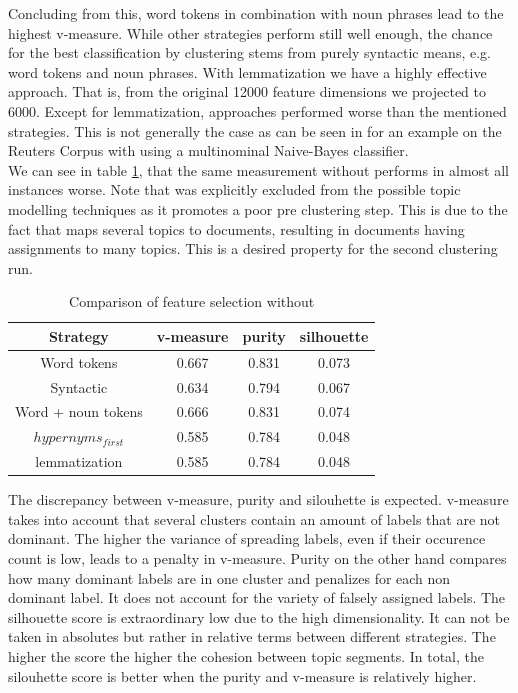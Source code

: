   Concluding from this, word tokens in combination with noun phrases lead to the highest v-measure. While other strategies perform still well enough, the chance for the best classification by clustering stems from purely syntactic means, e.g. word tokens and noun phrases. With \wordnet{} lemmatization we have a highly effective approach. That is, from the original 12000 feature dimensions we projected to 6000. Except for lemmatization, \wordnet{} approaches performed worse than the mentioned strategies. This is not generally the case as can be seen in \cite{TopicClassificationReuters2002} for an example on the Reuters Corpus with \wordnet{} using a multinominal Naive-Bayes classifier.\\
  We can see in table \ref{comparison_single_without_lsa}, that the same measurement without \lsa{} performs in almost all instances worse. Note that \lda{} was explicitly excluded from the possible topic modelling techniques as it promotes a poor pre clustering step. This is due to the fact that \lda{} maps several topics to documents, resulting in documents having assignments to many topics. This is a desired property for the second clustering run.

    \begin{table}\label{comparison_single_without_lsa}
      \begin{tabular}{ c | c | c | c }
        Strategy    & v-measure & purity  & silhouette \\ \hline
        Word tokens & 0.667     & 0.831   & 0.073      \\
        Syntactic   & 0.634     & 0.794     & 0.067 \\
        Word + noun tokens & 0.666   & 0.831     & 0.074 \\
        \wordnet{} $hypernyms_{first}$ & 0.585   & 0.784     & 0.048 \\
        \wordnet{} lemmatization   & 0.585   & 0.784     & 0.048 \\
      \end{tabular}
      \caption{Comparison of feature selection without \lsa{}}
    \end{table}

  The discrepancy between v-measure, purity and silouhette is expected. v-measure takes into account that several clusters contain an amount of labels that are not dominant. The higher the variance of spreading labels, even if their occurence count is low, leads to a penalty in v-measure. Purity on the other hand compares how many dominant labels are in one cluster and penalizes for each non dominant label. It does not account for the variety of falsely assigned labels. The silhouette score is extraordinary low due to the high dimensionality. It can not be taken in absolutes but rather in relative terms between different strategies. The higher the score the higher the cohesion between topic segments. In total, the silouhette score is better when the purity and v-measure is relatively higher.

